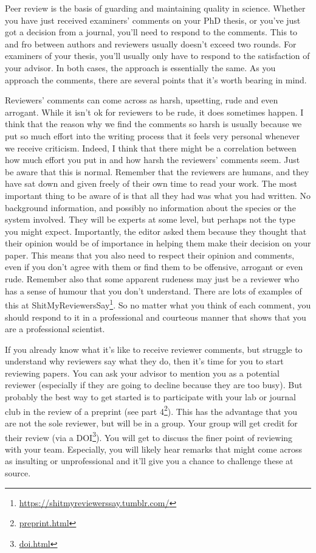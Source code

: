 \documentclass[
]{krantz}
\renewcommand{\href}[2]{#2\footnote{\url{#1}}}
\begin{document}
Peer review is the basis of guarding and maintaining quality in science. Whether you have just received examiners' comments on your PhD thesis, or you've just got a decision from a journal, you'll need to respond to the comments. This to and fro between authors and reviewers usually doesn't exceed two rounds. For examiners of your thesis, you'll usually only have to respond to the satisfaction of your advisor. In both cases, the approach is essentially the same. As you approach the comments, there are several points that it's worth bearing in mind.

Reviewers' comments can come across as harsh, upsetting, rude and even arrogant. While it isn't ok for reviewers to be rude, it does sometimes happen. I think that the reason why we find the comments so harsh is usually because we put so much effort into the writing process that it feels very personal whenever we receive criticism. Indeed, I think that there might be a correlation between how much effort you put in and how harsh the reviewers' comments seem. Just be aware that this is normal. Remember that the reviewers are humans, and they have sat down and given freely of their own time to read your work. The most important thing to be aware of is that all they had was what you had written. No background information, and possibly no information about the species or the system involved. They will be experts at some level, but perhaps not the type you might expect. Importantly, the editor asked them because they thought that their opinion would be of importance in helping them make their decision on your paper. This means that you also need to respect their opinion and comments, even if you don't agree with them or find them to be offensive, arrogant or even rude. Remember also that some apparent rudeness may just be a reviewer who has a sense of humour that you don't understand. There are lots of examples of this at \href{https://shitmyreviewerssay.tumblr.com/}{ShitMyReviewersSay}. So no matter what you think of each comment, you should respond to it in a professional and courteous manner that shows that you are a professional scientist.

If you already know what it's like to receive reviewer comments, but struggle to understand why reviewers say what they do, then it's time for you to start reviewing papers. You can ask your advisor to mention you as a potential reviewer (especially if they are going to decline because they are too busy). But probably the best way to get started is to participate with your lab or journal club in the review of a preprint (\href{preprint.html}{see part 4}). This has the advantage that you are not the sole reviewer, but will be in a group. Your group will get credit for their review (via a \href{doi.html}{DOI}). You will get to discuss the finer point of reviewing with your team. Especially, you will likely hear remarks that might come across as insulting or unprofessional and it'll give you a chance to challenge these at source.
\end{document}
